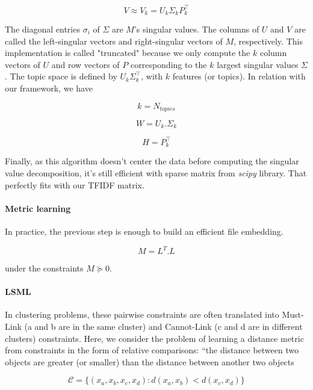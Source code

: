 \documentclass[a4paper]{article}
\begin{document}
	\begin{equation}
		V \approx V_k = U_k \Sigma_k P_k^\top
	\end{equation}
	
	The diagonal entries $\sigma_{i}$ of $\Sigma$ are $M$'s singular values. The columns of $U$ and $V$ are called the left-singular vectors and right-singular vectors of $M$, respectively. This implementation is called "truncated" because we only compute the $k$ column vectors of $U$ and row vectors of $P$ corresponding to the $k$ largest singular values $\Sigma$. The topic space is defined by $U_k \Sigma_k^\top$, with $k$ features (or topics). In relation with our framework, we have
	
	\[
		k = N_{topics}
	\]
	
	\[
		W = U_k.\Sigma_k
	\]
	
	\[
		H = P_k^\top
	\]
	
	Finally, as this algorithm doesn't center the data before computing the singular value decomposition, it's still efficient with sparse matrix from \emph{scipy} library. That perfectly fits with our \ac{TFIDF} matrix.
	
	\paragraph{Metric learning}
	
	In practice, the previous step is enough to build an efficient file embedding.

	\begin{equation}
		M = L^{T}.L
	\end{equation}
	
	under the constraints $M \succeq 0$.
	
	\paragraph{\acf{LSML}}
	
	In clustering problems, these pairwise constraints are often translated into Must-Link (a and b are in the same cluster) and Cannot-Link (c and d are in different clusters) constraints. Here, we consider the problem of learning a distance metric from constraints in the form of relative comparisons: “the distance between two objects are greater (or smaller) than the distance between another two objects
	
	\begin{equation}
		\mathcal{C} = \{(x_{a}, x_{b}, x_{c}, x_{d}):d(x_{a}, x_{b}) < d(x_{c}, x_{d})\}
	\end{equation}
	
\end{document}
